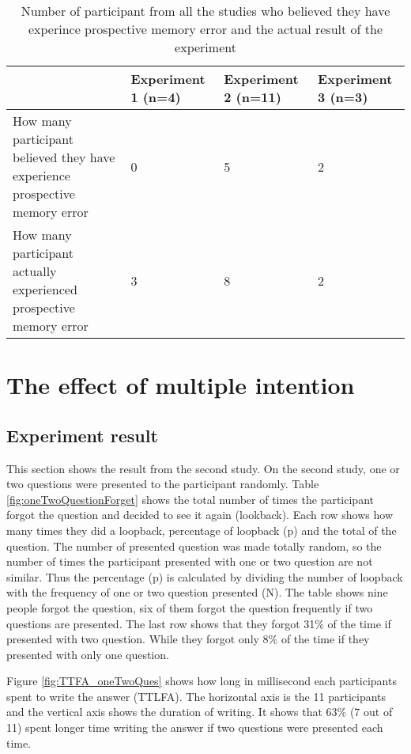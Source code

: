 \begin{table}[]
\centering
\small
\footnotesize
\begin{tabu}{|X[6,l]|X[2,c]|X[2,c]|X[2,c]|}
\hline
                                                                           & Experiment 1 (n=4) & Experiment 2 (n=11) & Experiment 3 (n=3) \\ \hline
How many participant believed they have experience prospective memory error & 0                  & 5                   & 2                  \\ \hline
How many participant actually experienced prospective memory error          & 3                  & 8                   & 2                  \\ \hline
\end{tabu}
\caption{Number of participant from all the studies who believed they have experince prospective memory error and the actual result of the experiment}
\label{fig:affirmationTable}
\end{table}



\section{The effect of multiple intention}

\subsection{Experiment result}
This section shows the result from the second study. On the second study, one or two questions were presented to the participant randomly.
Table \ref{fig:oneTwoQuestionForget} shows the total number of times the participant forgot the question and decided to see it again (lookback).
Each row shows how many times they did a loopback, percentage of loopback (p) and the total of the question.
The number of presented question was made totally random, so the number of times the participant presented with
one or two question are not similar. Thus the percentage (p) is calculated by dividing the number of loopback with the frequency of one or two question
presented (N).
The table shows nine people forgot the question, six of them forgot the question frequently if two questions are presented.
The last row shows that they forgot 31\% of the time if presented with two question.
While they forgot only 8\% of the time if they presented with only one question.

Figure \ref{fig:TTFA_oneTwoQues} shows how long in millisecond each participants spent to write the answer (TTLFA).
The horizontal axis is the 11 participants and the vertical axis shows the duration of writing.
 It shows that 63\% (7 out of 11) spent longer time writing the answer if two questions were presented each time.

